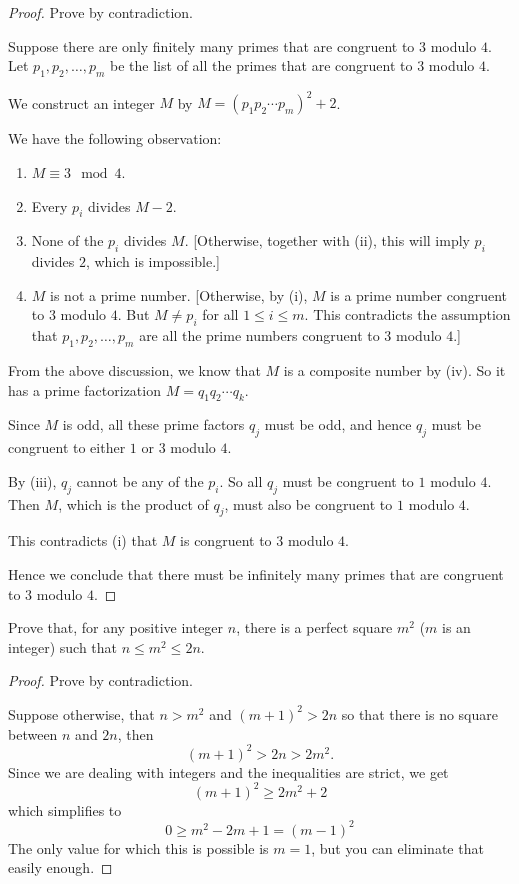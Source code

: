 \begin{proof}
Prove by contradiction.

Suppose there are only finitely many primes that are congruent to $3$ modulo $4$. Let $p_1,p_2,\dots,p_m$ be the list of all the primes that are congruent to $3$ modulo $4$.

We construct an integer $M$ by $M=(p_1p_2\cdots p_m)^2+2$.

We have the following observation:
\begin{enumerate}[label=(\roman*)]
\item  $M\equiv 3 \mod 4$.
\item Every $p_i$ divides $M-2$.
\item None of the $p_i$ divides $M$. [Otherwise, together with (ii), this will imply $p_i$ divides $2$, which is impossible.]
\item $M$ is not a prime number. [Otherwise, by (i), $M$ is a prime number congruent to $3$ modulo $4$. But $M\neq p_i$ for all $1\le i\le m$. This contradicts the assumption that $p_1,p_2,\dots,p_m$ are all the prime numbers congruent to $3$ modulo $4$.]
\end{enumerate}

From the above discussion, we know that $M$ is a composite number by (iv). So it has a prime factorization $M=q_1q_2\cdots q_k$.

Since $M$ is odd, all these prime factors $q_j$ must be odd, and hence $q_j$ must be congruent to either $1$ or $3$ modulo $4$.

By (iii), $q_j$ cannot be any of the $p_i$. So all $q_j$ must be congruent to $1$ modulo $4$. Then $M$, which is the product of $q_j$, must also be congruent to $1$ modulo $4$.

This contradicts (i) that $M$ is congruent to $3$ modulo $4$.

Hence we conclude that there must be infinitely many primes that are congruent to $3$ modulo $4$.
\end{proof}

\begin{prbm}
Prove that, for any positive integer $n$, there is a perfect square $m^2$ ($m$ is an integer) such that $n\le m^2\le 2n$.
\end{prbm}

\begin{proof}
Prove by contradiction.

Suppose otherwise, that $n>m^2$ and $(m+1)^2>2n$ so that there is no square between $n$ and $2n$, then
\[ (m+1)^2>2n>2m^2. \]
Since we are dealing with integers and the inequalities are strict, we get
\[ (m+1)^2\ge2m^2+2 \]
which simplifies to
\[ 0\ge m^2-2m+1=(m-1)^2 \]
The only value for which this is possible is $m=1$, but you can eliminate that easily enough.
\end{proof}





